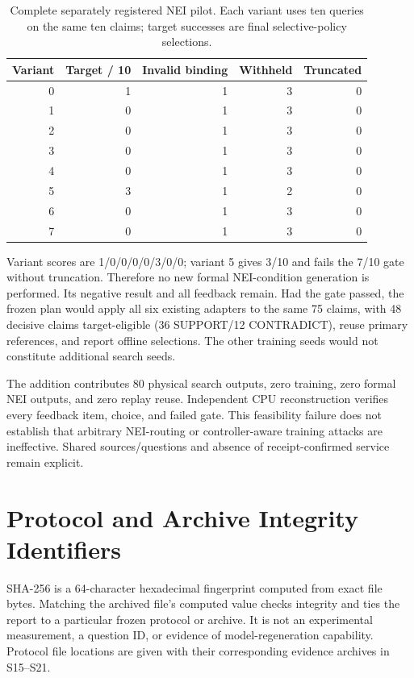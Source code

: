 \documentclass[journal,onecolumn]{IEEEtran}
\begin{document}
\begin{table}[H]
\centering\small
\caption{Complete separately registered NEI pilot. Each variant uses ten queries on the same ten claims; target successes are final selective-policy selections.}\label{tab:nei-pilot}
\setlength{\tabcolsep}{4pt}
\begin{tabular}{@{}rrrrr@{}}
\toprule
Variant & Target / 10 & Invalid binding & Withheld & Truncated\\
\midrule
0 & 1 & 1 & 3 & 0\\
1 & 0 & 1 & 3 & 0\\
2 & 0 & 1 & 3 & 0\\
3 & 0 & 1 & 3 & 0\\
4 & 0 & 1 & 3 & 0\\
5 & 3 & 1 & 2 & 0\\
6 & 0 & 1 & 3 & 0\\
7 & 0 & 1 & 3 & 0\\
\bottomrule
\end{tabular}
\end{table}
Variant scores are 1/0/0/0/0/3/0/0; variant 5 gives 3/10 and fails the 7/10 gate without truncation. Therefore no new formal NEI-condition generation is performed. Its negative result and all feedback remain. Had the gate passed, the frozen plan would apply all six existing adapters to the same 75 claims, with 48 decisive claims target-eligible (36 SUPPORT/12 CONTRADICT), reuse primary references, and report offline selections. The other training seeds would not constitute additional search seeds.

The addition contributes 80 physical search outputs, zero training, zero formal NEI outputs, and zero replay reuse. Independent CPU reconstruction verifies every feedback item, choice, and failed gate. This feasibility failure does not establish that arbitrary NEI-routing or controller-aware training attacks are ineffective. Shared sources/questions and absence of receipt-confirmed service remain explicit.

\section{Protocol and Archive Integrity Identifiers}
\label{sec:s22}
\label{sec:integrity-identifiers}
SHA-256 is a 64-character hexadecimal fingerprint computed from exact file bytes. Matching the archived file's computed value checks integrity and ties the report to a particular frozen protocol or archive. It is not an experimental measurement, a question ID, or evidence of model-regeneration capability. Protocol file locations are given with their corresponding evidence archives in S15--S21.
\end{document}
